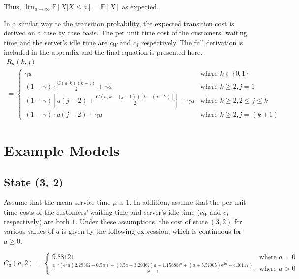 Thus, $\displaystyle \lim_{a \to \infty} \mathbb{E} [X | X \leq a] = \mathbb{E} [X]$ as expected.

In a similar way to the transition probability, the expected transition cost is derived on a case by case basis. The per unit time cost of the customers' waiting time and the server's idle time are $c_{W}$ and $c_{I}$ respectively. The full derivation is included in the appendix and the final equation is presented here.
\begin{multline}
	R_{a} (k, j) \\
	= \begin{cases}
		\gamma a & \text{where $k \in \{ 0, 1 \}$} \\
		(1 - \gamma) \cdot \frac{G (a; k) (k - 1)}{2} + \gamma a & \text{where $k \geq 2, j = 1$} \\
		(1 - \gamma) \left[ a (j - 2) + \frac{G (a; k - (j - 1)) [k - (j - 2)]}{2} \right] + \gamma a & \text{where $k \geq 2, 2 \leq j \leq k$} \\
		(1 - \gamma) \cdot a (j - 2) + \gamma a & \text{where $k \geq 2, j = (k + 1)$}
	\end{cases}
\end{multline}

\section{Example Models}
\subsection{State (3, 2)}

Assume that the mean service time $\mu$ is $1$. In addition, assume that the per unit time costs of the customers' waiting time and server's idle time ($c_{W}$ and $c_{I}$ respectively) are both $1$. Under these assumptions, the cost of state $(3, 2)$ for various values of $a$ is given by the following expression, which is continuous for $a \geq 0$.

\begin{equation*}
	C_{3} (a, 2) =
	\begin{cases}
 		9.88121 & \text{where $a = 0$} \\
 		\frac{\mathrm{e}^{-a} \left( \mathrm{e}^{a} a (2.29362 - 0.5 a) - (0.5 a + 3.29362) a - 1.15888 \mathrm{e}^{a} + (a + 5.52005) \mathrm{e}^{2 a} - 4.36117 \right)}{\mathrm{e}^{a} - 1} & \text{where $a > 0$}
	\end{cases}
\end{equation*}

